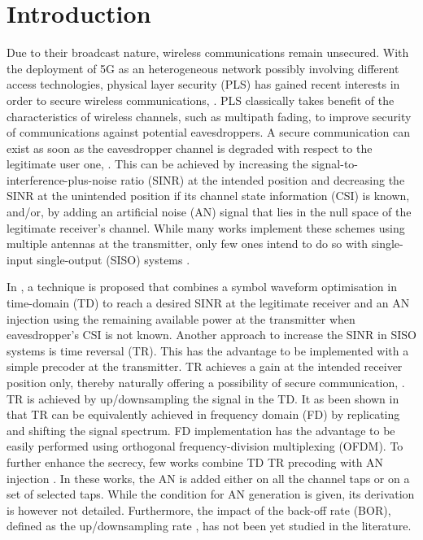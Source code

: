 \documentclass[a4paper,11pt]{article}
\begin{document}
\section{Introduction}
Due to their broadcast nature, wireless communications remain unsecured. With the  deployment of 5G as an heterogeneous network possibly involving different access technologies, physical layer security (PLS) has gained recent interests in order to secure wireless communications, \cite{PLS_litt1,PLS_litt2,PLS_litt3}. PLS classically takes benefit of the characteristics of wireless channels, such as multipath fading, to improve security of communications against potential eavesdroppers. A secure communication can exist as soon as the eavesdropper channel is degraded with respect to the legitimate user one, \cite{wyner}. This can be achieved by increasing the signal-to-interference-plus-noise ratio (SINR) at the intended position and decreasing the SINR at the unintended position if its channel state information (CSI) is known, and/or, by adding an artificial noise (AN) signal that lies in the null space of the legitimate receiver's channel. While many works implement these schemes using multiple antennas at the transmitter, only few ones intend to do so with single-input single-output (SISO) systems \cite{PLS_litt4,TR_FD_TD,TR_AN_2018_xu,TR_AN_2017_Li,TR_AN_2018_Li}.

In \cite{PLS_litt4}, a technique is proposed that combines a symbol waveform optimisation in time-domain (TD) to reach a desired SINR at the legitimate receiver and an AN injection using the remaining available power at the transmitter when eavesdropper's CSI is not known. Another approach to increase the SINR in SISO systems is time reversal (TR). This has the advantage to be implemented with a simple precoder at the transmitter. TR achieves a gain at the intended receiver position only, thereby naturally offering a possibility of secure communication, \cite{otges}. TR is achieved by up/downsampling the signal in the TD. It as been shown in  \cite{TR_FD_TD} that TR can be equivalently achieved in frequency domain (FD) by replicating and shifting the signal spectrum. FD implementation has the advantage to be easily performed using orthogonal frequency-division multiplexing (OFDM). To further enhance the secrecy, few works combine TD TR precoding with AN injection \cite{TR_AN_2018_xu,TR_AN_2017_Li,TR_AN_2018_Li}. In these works, the AN is added either on all the channel taps or on a set of selected taps. While the condition for AN generation is given, its derivation is however not detailed. Furthermore, the impact of the back-off rate (BOR), defined as the up/downsampling rate \cite{TR_bor}, has not been yet studied in the literature. 
\end{document}
